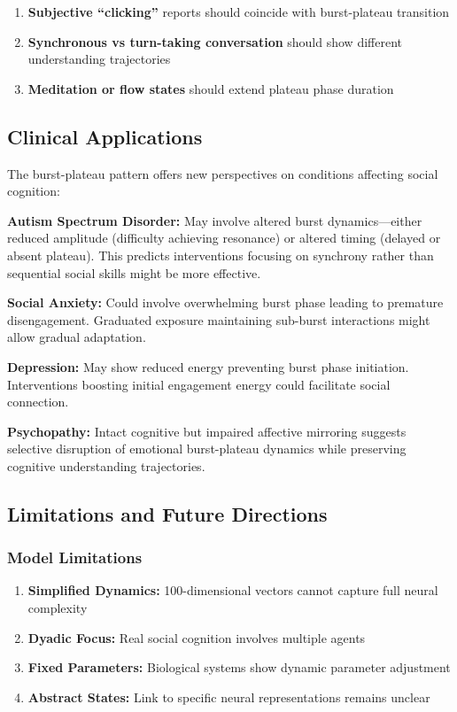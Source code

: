 \documentclass[12pt]{article}
\begin{document}
\begin{enumerate}
\item \textbf{Subjective ``clicking''} reports should coincide with burst-plateau transition
\item \textbf{Synchronous vs turn-taking conversation} should show different understanding trajectories
\item \textbf{Meditation or flow states} should extend plateau phase duration
\end{enumerate}

\subsection{Clinical Applications}

The burst-plateau pattern offers new perspectives on conditions affecting social cognition:

\textbf{Autism Spectrum Disorder:} May involve altered burst dynamics—either reduced amplitude (difficulty achieving resonance) or altered timing (delayed or absent plateau). This predicts interventions focusing on synchrony rather than sequential social skills might be more effective.

\textbf{Social Anxiety:} Could involve overwhelming burst phase leading to premature disengagement. Graduated exposure maintaining sub-burst interactions might allow gradual adaptation.

\textbf{Depression:} May show reduced energy preventing burst phase initiation. Interventions boosting initial engagement energy could facilitate social connection.

\textbf{Psychopathy:} Intact cognitive but impaired affective mirroring suggests selective disruption of emotional burst-plateau dynamics while preserving cognitive understanding trajectories.

\subsection{Limitations and Future Directions}

\subsubsection{Model Limitations}

\begin{enumerate}
\item \textbf{Simplified Dynamics:} 100-dimensional vectors cannot capture full neural complexity
\item \textbf{Dyadic Focus:} Real social cognition involves multiple agents
\item \textbf{Fixed Parameters:} Biological systems show dynamic parameter adjustment
\item \textbf{Abstract States:} Link to specific neural representations remains unclear
\end{enumerate}
\end{document}
